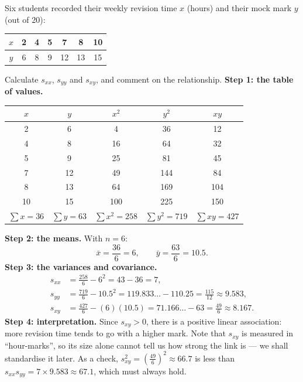\documentclass[11pt]{article}
\begin{document}
\begin{exoresolu}
Six students recorded their weekly revision time $x$ (hours) and their mock mark $y$ (out of 20):
\begin{center}
\begin{tabular}{|c|cccccc|}
\hline
\rowcolor{popblueL} $x$ & 2 & 4 & 5 & 7 & 8 & 10 \\
\hline
\rowcolor{popblueL} $y$ & 6 & 8 & 9 & 12 & 13 & 15 \\
\hline
\end{tabular}
\end{center}
Calculate $s_{xx}$, $s_{yy}$ and $s_{xy}$, and comment on the relationship.
\tcblower
\textbf{Step 1: the table of values.}
\begin{center}
\begin{tabular}{|c|c|c|c|c|}
\hline
\rowcolor{popblueL} $x$ & $y$ & $x^2$ & $y^2$ & $xy$ \\
\hline
2 & 6 & 4 & 36 & 12 \\
4 & 8 & 16 & 64 & 32 \\
5 & 9 & 25 & 81 & 45 \\
7 & 12 & 49 & 144 & 84 \\
8 & 13 & 64 & 169 & 104 \\
10 & 15 & 100 & 225 & 150 \\
\hline
\rowcolor{popblueL} $\sum x=36$ & $\sum y=63$ & $\sum x^2=258$ & $\sum y^2=719$ & $\sum xy=427$ \\
\hline
\end{tabular}
\end{center}
\textbf{Step 2: the means.} With $n=6$:
\[ \bar{x}=\frac{36}{6}=6,\qquad \bar{y}=\frac{63}{6}=10.5. \]
\textbf{Step 3: the variances and covariance.}
\begin{align*}
s_{xx}&=\frac{258}{6}-6^2=43-36=7,\\[2pt]
s_{yy}&=\frac{719}{6}-10.5^2=119.833\ldots-110.25=\frac{115}{12}\approx 9.583,\\[2pt]
s_{xy}&=\frac{427}{6}-(6)(10.5)=71.166\ldots-63=\frac{49}{6}\approx 8.167.
\end{align*}
\textbf{Step 4: interpretation.} Since $s_{xy}>0$, there is a positive linear association: more revision time tends to go with a higher mark. Note that $s_{xy}$ is measured in ``hour-marks'', so its size alone cannot tell us how strong the link is — we shall standardise it later. As a check, $s_{xy}^2=\left(\tfrac{49}{6}\right)^2\approx 66.7$ is less than $s_{xx}s_{yy}=7\times 9.583\approx 67.1$, which must always hold.
\end{exoresolu}
\end{document}
